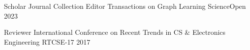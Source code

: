 



\begin{cvhonors}


  \cvhonor
    {Scholar Journal Collection Editor} %
    {Transactions on Graph Learning} %
    {ScienceOpen} %
    {2023} %

  \cvhonor
    {Reviewer} %
    {International Conference on Recent Trends in CS \& Electronics Engineering} %
    {RTCSE-17} %
    {2017} %

%
%

\end{cvhonors}
